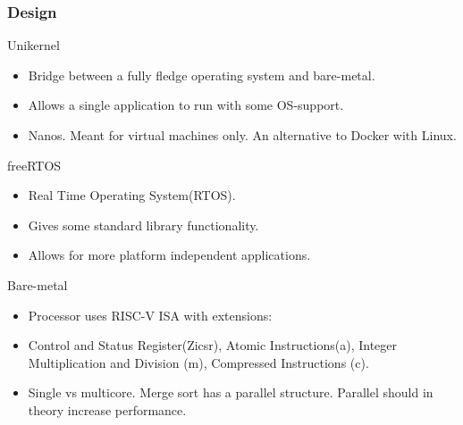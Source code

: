 \begin{frame}[hoved]
	\frametitle{Design}
	{\large Unikernel}
	\begin{itemize}
		\item Bridge between a fully fledge operating system and bare-metal.
		\item Allows a single application to run with some OS-support.
		\item Nanos. Meant for virtual machines only. An alternative to Docker with
		      Linux.
	\end{itemize}
	{\large freeRTOS}
	\begin{itemize}
		\item Real Time Operating System(RTOS).
		\item Gives some standard library functionality.
		\item Allows for more platform independent applications.
	\end{itemize}
	{\large Bare-metal}
	\begin{itemize}
		\item Processor uses RISC-V ISA with extensions:
		\item Control and Status Register(Zicsr), Atomic Instructions(a), Integer
		      Multiplication and Division (m), Compressed Instructions (c).
		\item Single vs multicore. Merge sort has a parallel structure. Parallel
		      should in theory increase performance.
	\end{itemize}
\end{frame}


